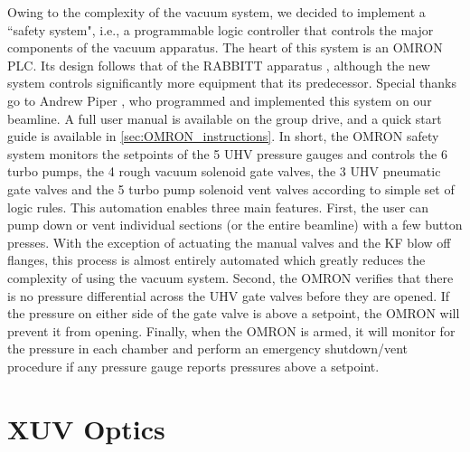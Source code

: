 Owing to the complexity of the vacuum system, we decided to implement a ``safety system", i.e., a programmable logic controller that controls the major components of the vacuum apparatus. The heart of this system is an OMRON PLC. Its design follows that of the RABBITT apparatus \cite{chirlaAttosecondPulseGeneration2011}, although the new system controls significantly more equipment that its predecessor. Special thanks go to Andrew Piper \cite{piperAndrewPiperDissertation2022}, who programmed and implemented this system on our beamline. A full user manual is available on the group drive, and a quick start guide is available in \cref{sec:OMRON_instructions}. In short, the OMRON safety system monitors the setpoints of the 5 UHV pressure gauges and controls the 6 turbo pumps, the 4 rough vacuum solenoid gate valves, the 3 UHV pneumatic gate valves and the 5 turbo pump solenoid vent valves according to simple set of logic rules. This automation enables three main features. First, the user can pump down or vent individual sections (or the entire beamline) with a few button presses. With the exception of actuating the manual valves and the KF blow off flanges, this process is almost entirely automated which greatly reduces the complexity of using the vacuum system. Second, the OMRON verifies that there is no pressure differential across the UHV gate valves before they are opened. If the pressure on either side of the gate valve is above a setpoint, the OMRON will prevent it from opening. Finally, when the OMRON is armed, it will monitor for the pressure in each chamber and perform an emergency shutdown/vent procedure if any pressure gauge reports pressures above a setpoint.

\section{XUV Optics}
\label{sec:Interferometer_Design}

